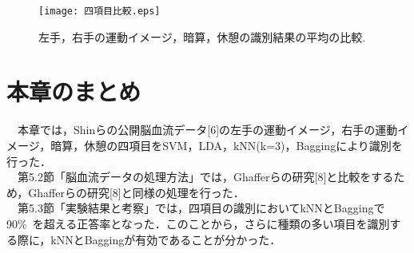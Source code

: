 \documentclass[a4j,12pt]{jreport}
\begin{document}
\begin{figure}[t]
  \begin{center}
    \texttt{[image: 四項目比較.eps]}
    \caption{左手，右手の運動イメージ，暗算，休憩の識別結果の平均の比較.}
    \label{fig}
  \end{center}
\end{figure}

\section{本章のまとめ}
　本章では，Shinらの公開脳血流データ[6]の左手の運動イメージ，右手の運動イメージ，暗算，休憩の四項目をSVM，LDA，kNN(k=3)，Baggingにより識別を行った．\\
　第5.2節「脳血流データの処理方法」では，Ghafferらの研究[8]と比較をするため，Ghafferらの研究[8]と同様の処理を行った．\\
　第5.3節「実験結果と考察」では，四項目の識別においてkNNとBaggingで90\%\ を超える正答率となった．このことから，さらに種類の多い項目を識別する際に，kNNとBaggingが有効であることが分かった．\\
\end{document}

